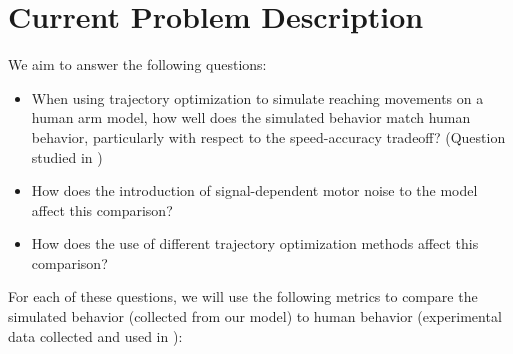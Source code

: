 \documentclass[table,12pt]{article}
\begin{document}
\section{Current Problem Description}
We aim to answer the following questions: 
\begin{itemize}
    \item When using trajectory optimization to simulate reaching movements on a human arm model, how well does the simulated behavior match human behavior, particularly with respect to the speed-accuracy tradeoff? (Question studied in \cite{c5})

    \item How does the introduction of signal-dependent motor noise to the model affect this comparison?

    \item How does the use of different trajectory optimization methods affect this comparison?
\end{itemize}
For each of these questions, we will use the following metrics to compare the simulated behavior (collected from our model) to human behavior (experimental data collected and used in \cite{c5}):
\end{document}
